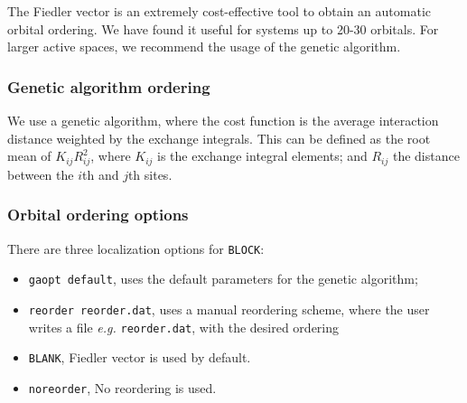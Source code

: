 \documentclass[letterpaper,12pt,aps, pra]{revtex4-1}
\begin{document}
The Fiedler vector is an extremely cost-effective tool to obtain an automatic
orbital ordering. We have found it useful for systems up to 20-30 orbitals.
For larger active spaces, we recommend the usage of the genetic algorithm.

\subsubsection{Genetic algorithm ordering}

We use a genetic algorithm, where the cost function is the average interaction
distance weighted by the exchange integrals. This can be defined as the root
mean of $K_{ij}R_{ij}^{2}$, where $K_{ij}$ is the exchange integral elements;
and $R_{ij}$ the distance between the $i$th and $j$th sites.

\subsubsection{Orbital ordering options}
There are three localization options for \texttt{BLOCK}:
\begin{itemize}
	\item \texttt{gaopt default}, uses the default parameters for the genetic
		algorithm;
	\item \texttt{reorder reorder.dat}, uses a manual reordering scheme,
		where the user writes a file \textit{e.g.} \texttt{reorder.dat}, 
		with the desired ordering
	\item \texttt{BLANK}, Fiedler vector is used by default.
   \item \texttt{noreorder}, No reordering is used.

\end{itemize}
 
\end{document}
